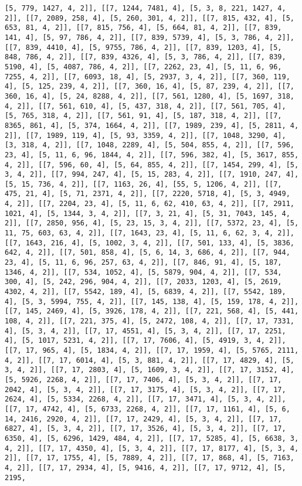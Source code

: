 \documentclass[12pt,fleqn]{article}\usepackage{../../common}
\begin{document}
\begin{verbatim}
[5, 779, 1427, 4, 2]], [[7, 1244, 7481, 4], [5, 3, 8, 221, 1427, 4, 2]], [[7, 2089, 258, 4], [5, 260, 301, 4, 2]], [[7, 815, 432, 4], [5, 653, 81, 4, 2]], [[7, 815, 756, 4], [5, 664, 81, 4, 2]], [[7, 839, 141, 4], [5, 97, 786, 4, 2]], [[7, 839, 5739, 4], [5, 3, 786, 4, 2]], [[7, 839, 4410, 4], [5, 9755, 786, 4, 2]], [[7, 839, 1203, 4], [5, 848, 786, 4, 2]], [[7, 839, 4326, 4], [5, 3, 786, 4, 2]], [[7, 839, 5190, 4], [5, 4087, 786, 4, 2]], [[7, 2262, 23, 4], [5, 11, 6, 96, 7255, 4, 2]], [[7, 6093, 18, 4], [5, 2937, 3, 4, 2]], [[7, 360, 119, 4], [5, 125, 239, 4, 2]], [[7, 360, 16, 4], [5, 87, 239, 4, 2]], [[7, 360, 16, 4], [5, 24, 8288, 4, 2]], [[7, 561, 1280, 4], [5, 1697, 318, 4, 2]], [[7, 561, 610, 4], [5, 437, 318, 4, 2]], [[7, 561, 705, 4], [5, 765, 318, 4, 2]], [[7, 561, 91, 4], [5, 187, 318, 4, 2]], [[7, 8365, 861, 4], [5, 374, 1664, 4, 2]], [[7, 1989, 239, 4], [5, 2811, 4, 2]], [[7, 1989, 119, 4], [5, 93, 3359, 4, 2]], [[7, 1048, 3290, 4], [3, 318, 4, 2]], [[7, 1048, 2289, 4], [5, 504, 855, 4, 2]], [[7, 596, 23, 4], [5, 11, 6, 96, 1844, 4, 2]], [[7, 596, 382, 4], [5, 3617, 855, 4, 2]], [[7, 596, 60, 4], [5, 64, 855, 4, 2]], [[7, 1454, 299, 4], [5, 3, 4, 2]], [[7, 994, 247, 4], [5, 15, 283, 4, 2]], [[7, 1910, 247, 4], [5, 15, 736, 4, 2]], [[7, 1163, 26, 4], [55, 5, 1206, 4, 2]], [[7, 475, 21, 4], [5, 71, 2371, 4, 2]], [[7, 2220, 5718, 4], [5, 3, 4949, 4, 2]], [[7, 2204, 23, 4], [5, 11, 6, 62, 410, 63, 4, 2]], [[7, 2911, 1021, 4], [5, 1344, 3, 4, 2]], [[7, 3, 21, 4], [5, 31, 7043, 145, 4, 2]], [[7, 2850, 956, 4], [5, 23, 15, 3, 4, 2]], [[7, 5372, 23, 4], [5, 11, 75, 603, 63, 4, 2]], [[7, 1643, 23, 4], [5, 11, 6, 62, 3, 4, 2]], [[7, 1643, 216, 4], [5, 1002, 3, 4, 2]], [[7, 501, 133, 4], [5, 3836, 642, 4, 2]], [[7, 501, 858, 4], [5, 6, 14, 3, 686, 4, 2]], [[7, 944, 23, 4], [5, 11, 6, 96, 257, 63, 4, 2]], [[7, 846, 91, 4], [5, 187, 1346, 4, 2]], [[7, 534, 1052, 4], [5, 5879, 904, 4, 2]], [[7, 534, 300, 4], [5, 242, 296, 904, 4, 2]], [[7, 2033, 1203, 4], [5, 2619, 4302, 4, 2]], [[7, 5542, 189, 4], [5, 6839, 4, 2]], [[7, 5542, 189, 4], [5, 3, 5994, 755, 4, 2]], [[7, 145, 138, 4], [5, 159, 178, 4, 2]], [[7, 145, 2469, 4], [5, 3926, 178, 4, 2]], [[7, 221, 568, 4], [5, 441, 108, 4, 2]], [[7, 221, 375, 4], [5, 2472, 108, 4, 2]], [[7, 17, 7331, 4], [5, 3, 4, 2]], [[7, 17, 4551, 4], [5, 3, 4, 2]], [[7, 17, 2251, 4], [5, 1017, 5231, 4, 2]], [[7, 17, 7606, 4], [5, 4919, 3, 4, 2]], [[7, 17, 965, 4], [5, 1834, 4, 2]], [[7, 17, 1959, 4], [5, 5765, 2111, 4, 2]], [[7, 17, 6014, 4], [5, 3, 881, 4, 2]], [[7, 17, 4829, 4], [5, 3, 4, 2]], [[7, 17, 2803, 4], [5, 1609, 3, 4, 2]], [[7, 17, 3152, 4], [5, 5926, 2268, 4, 2]], [[7, 17, 7406, 4], [5, 3, 4, 2]], [[7, 17, 2042, 4], [5, 3, 4, 2]], [[7, 17, 3175, 4], [5, 3, 4, 2]], [[7, 17, 2624, 4], [5, 5334, 2268, 4, 2]], [[7, 17, 3471, 4], [5, 3, 4, 2]], [[7, 17, 4742, 4], [5, 6733, 2268, 4, 2]], [[7, 17, 1161, 4], [5, 6, 14, 2416, 2920, 4, 2]], [[7, 17, 2429, 4], [5, 3, 4, 2]], [[7, 17, 6827, 4], [5, 3, 4, 2]], [[7, 17, 3526, 4], [5, 3, 4, 2]], [[7, 17, 6350, 4], [5, 6296, 1429, 484, 4, 2]], [[7, 17, 5285, 4], [5, 6638, 3, 4, 2]], [[7, 17, 4350, 4], [5, 3, 4, 2]], [[7, 17, 8177, 4], [5, 3, 4, 2]], [[7, 17, 1755, 4], [5, 7889, 4, 2]], [[7, 17, 868, 4], [5, 7163, 4, 2]], [[7, 17, 2934, 4], [5, 9416, 4, 2]], [[7, 17, 9712, 4], [5, 2195, 
\end{verbatim}
\end{document}
